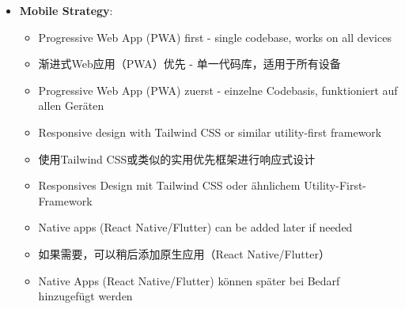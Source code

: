 \begin{itemize}
    \item \textbf{Mobile Strategy}:
    \begin{itemize}
        \item Progressive Web App (PWA) first - single codebase, works on all devices
        \item 渐进式Web应用（PWA）优先 - 单一代码库，适用于所有设备
        \item Progressive Web App (PWA) zuerst - einzelne Codebasis, funktioniert auf allen Geräten
        \item Responsive design with Tailwind CSS or similar utility-first framework
        \item 使用Tailwind CSS或类似的实用优先框架进行响应式设计
        \item Responsives Design mit Tailwind CSS oder ähnlichem Utility-First-Framework
        \item Native apps (React Native/Flutter) can be added later if needed
        \item 如果需要，可以稍后添加原生应用（React Native/Flutter）
        \item Native Apps (React Native/Flutter) können später bei Bedarf hinzugefügt werden
    \end{itemize}
\end{itemize}

